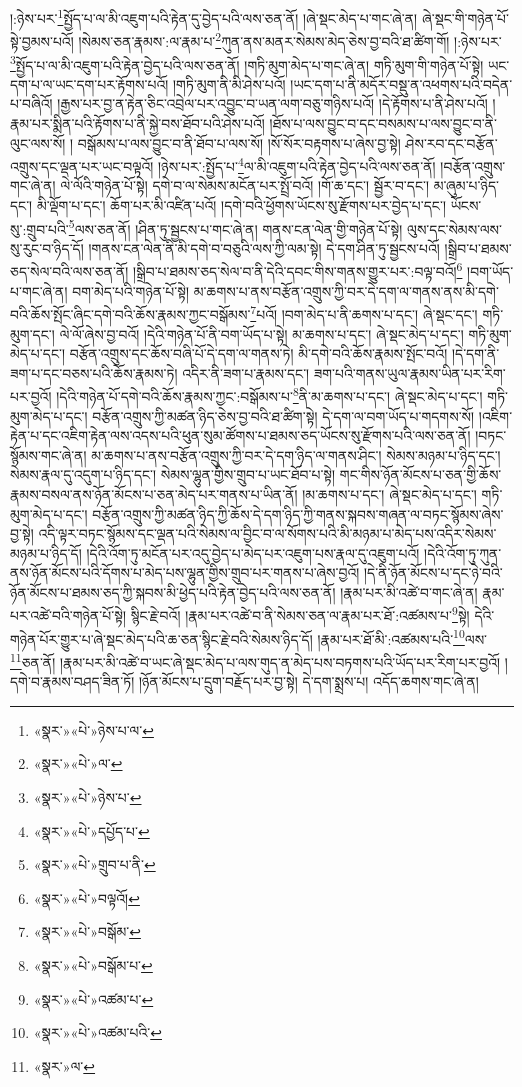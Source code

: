 །:ཉེས་པར་\footnote{«སྣར་»«པེ་»ཉེས་པ་ལ་}སྤྱོད་པ་ལ་མི་འཇུག་པའི་རྟེན་དུ་བྱེད་པའི་ལས་ཅན་ནོ། །ཞེ་སྡང་མེད་པ་གང་ཞེ་ན། ཞེ་སྡང་གི་གཉེན་པོ་སྟེ་བྱམས་པའོ། །སེམས་ཅན་རྣམས་:ལ་རྣམ་པ་\footnote{«སྣར་»«པེ་»ལ་}ཀུན་ནས་མནར་སེམས་མེད་ཅེས་བྱ་བའི་ཐ་ཚིག་གོ། །:ཉེས་པར་\footnote{«སྣར་»«པེ་»ཉེས་པ་}སྤྱོད་པ་ལ་མི་འཇུག་པའི་རྟེན་བྱེད་པའི་ལས་ཅན་ནོ། །གཏི་མུག་མེད་པ་གང་ཞེ་ན། གཏི་མུག་གི་གཉེན་པོ་སྟེ། ཡང་དག་པ་ལ་ཡང་དག་པར་རྟོགས་པའོ། །གཏི་མུག་ནི་མི་ཤེས་པའོ། །ཡང་དག་པ་ནི་མདོར་བསྡུ་ན་འཕགས་པའི་བདེན་པ་བཞིའོ། །རྒྱས་པར་བྱ་ན་རྟེན་ཅིང་འབྲེལ་པར་འབྱུང་བ་ཡན་ལག་བཅུ་གཉིས་པའོ། །དེ་རྟོགས་པ་ནི་ཤེས་པའོ། །རྣམ་པར་སྨིན་པའི་རྟོགས་པ་ནི་སྐྱེ་བས་ཐོབ་པའི་ཤེས་པའོ། །ཐོས་པ་ལས་བྱུང་བ་དང་བསམས་པ་ལས་བྱུང་བ་ནི་ལུང་ལས་སོ། །
བསྒོམས་པ་ལས་བྱུང་བ་ནི་ཐོབ་པ་ལས་སོ། །སོ་སོར་བརྟགས་པ་ཞེས་བྱ་སྟེ། ཤེས་རབ་དང་བརྩོན་འགྲུས་དང་ལྡན་པར་ཡང་བལྟའོ། །ཉེས་པར་:སྤྱོད་པ་\footnote{«སྣར་»«པེ་»དཔྱོད་པ་}ལ་མི་འཇུག་པའི་རྟེན་བྱེད་པའི་ལས་ཅན་ནོ། །བརྩོན་འགྲུས་གང་ཞེ་ན། ལེ་ལོའི་གཉེན་པོ་སྟེ། དགེ་བ་ལ་སེམས་མངོན་པར་སྤྲོ་བའོ། །གོ་ཆ་དང་། སྦྱོར་བ་དང་། མ་ཞུམ་པ་ཉིད་དང་། མི་ལྡོག་པ་དང་། ཆོག་པར་མི་འཛིན་པའོ། །དགེ་བའི་ཕྱོགས་ཡོངས་སུ་རྫོགས་པར་བྱེད་པ་དང་། ཡོངས་སུ་:གྲུབ་པའི་\footnote{«སྣར་»«པེ་»གྲུབ་པ་ནི་}ལས་ཅན་ནོ། །ཤིན་ཏུ་སྦྱངས་པ་གང་ཞེ་ན། གནས་ངན་ལེན་གྱི་གཉེན་པོ་སྟེ། ལུས་དང་སེམས་ལས་སུ་རུང་བ་ཉིད་དོ། །གནས་ངན་ལེན་ནི་མི་དགེ་བ་བཅུའི་ལས་ཀྱི་ལམ་སྟེ། དེ་དག་ཤིན་ཏུ་སྦྱངས་པའོ། །སྒྲིབ་པ་ཐམས་ཅད་སེལ་བའི་ལས་ཅན་ནོ། །སྒྲིབ་པ་ཐམས་ཅད་སེལ་བ་ནི་དེའི་དབང་གིས་གནས་གྱུར་པར་:བལྟ་བའོ།\footnote{«སྣར་»«པེ་»བལྟའོ།} །བག་ཡོད་པ་གང་ཞེ་ན། བག་མེད་པའི་གཉེན་པོ་སྟེ། མ་ཆགས་པ་ནས་བརྩོན་འགྲུས་ཀྱི་བར་དེ་དག་ལ་གནས་ནས་མི་དགེ་བའི་ཆོས་སྤོང་ཞིང་དགེ་བའི་ཆོས་རྣམས་ཀྱང་བསྒོམས་\footnote{«སྣར་»«པེ་»བསྒོམ་}པའོ། །བག་མེད་པ་ནི་ཆགས་པ་དང་། ཞེ་སྡང་དང་། གཏི་མུག་དང་། ལེ་ལོ་ཞེས་བྱ་བའོ། །དེའི་གཉེན་པོ་ནི་བག་ཡོད་པ་སྟེ། མ་ཆགས་པ་དང་། ཞེ་སྡང་མེད་པ་དང་། གཏི་མུག་མེད་པ་དང་། བརྩོན་འགྲུས་དང་ཆོས་བཞི་པོ་དེ་དག་ལ་གནས་ཏེ། མི་དགེ་བའི་ཆོས་རྣམས་སྤོང་བའོ། །དེ་དག་ནི་ཟག་པ་དང་བཅས་པའི་ཆོས་རྣམས་ཏེ། འདིར་ནི་ཟག་པ་རྣམས་དང་། ཟག་པའི་གནས་ཡུལ་རྣམས་ཡིན་པར་རིག་པར་བྱའོ། །དེའི་གཉེན་པོ་དགེ་བའི་ཆོས་རྣམས་ཀྱང་:བསྒོམས་པ་\footnote{«སྣར་»«པེ་»བསྒོམ་པ་}ནི་མ་ཆགས་པ་དང་། ཞེ་སྡང་མེད་པ་དང་། གཏི་མུག་མེད་པ་དང་། བརྩོན་འགྲུས་ཀྱི་མཚན་ཉིད་ཅེས་བྱ་བའི་ཐ་ཚིག་སྟེ། དེ་དག་ལ་བག་ཡོད་པ་གདགས་སོ། །འཇིག་རྟེན་པ་དང་འཇིག་རྟེན་ལས་འདས་པའི་ཕུན་སུམ་ཚོགས་པ་ཐམས་ཅད་ཡོངས་སུ་རྫོགས་པའི་ལས་ཅན་ནོ། །བཏང་སྙོམས་གང་ཞེ་ན། མ་ཆགས་པ་ནས་བརྩོན་འགྲུས་ཀྱི་བར་དེ་དག་ཉིད་ལ་གནས་ཤིང་། སེམས་མཉམ་པ་ཉིད་དང་། སེམས་རྣལ་དུ་འདུག་པ་ཉིད་དང་། སེམས་ལྷུན་གྱིས་གྲུབ་པ་ཡང་ཐོབ་པ་སྟེ། གང་གིས་ཉོན་མོངས་པ་ཅན་གྱི་ཆོས་རྣམས་བསལ་ནས་ཉོན་མོངས་པ་ཅན་མེད་པར་གནས་པ་ཡིན་ནོ། །མ་ཆགས་པ་དང་། ཞེ་སྡང་མེད་པ་དང་། གཏི་མུག་མེད་པ་དང་། བརྩོན་འགྲུས་ཀྱི་མཚན་ཉིད་ཀྱི་ཆོས་དེ་དག་ཉིད་ཀྱི་གནས་སྐབས་གཞན་ལ་བཏང་སྙོམས་ཞེས་བྱ་སྟེ། འདི་ལྟར་བཏང་སྙོམས་དང་ལྡན་པའི་སེམས་ལ་བྱིང་བ་ལ་སོགས་པའི་མི་མཉམ་པ་མེད་པས་འདིར་སེམས་མཉམ་པ་ཉིད་དོ། །དེའི་འོག་ཏུ་མངོན་པར་འདུ་བྱེད་པ་མེད་པར་འཇུག་པས་རྣལ་དུ་འཇུག་པའོ། །དེའི་འོག་ཏུ་ཀུན་ནས་ཉོན་མོངས་པའི་དོགས་པ་མེད་པས་ལྷུན་གྱིས་གྲུབ་པར་གནས་པ་ཞེས་བྱའོ། །དེ་ནི་ཉོན་མོངས་པ་དང་ཉེ་བའི་ཉོན་མོངས་པ་ཐམས་ཅད་ཀྱི་སྐབས་མི་ཕྱེད་པའི་རྟེན་བྱེད་པའི་ལས་ཅན་ནོ། །རྣམ་པར་མི་འཚེ་བ་གང་ཞེ་ན། རྣམ་པར་འཚེ་བའི་གཉེན་པོ་སྟེ། སྙིང་རྗེ་བའོ། །རྣམ་པར་འཚེ་བ་ནི་སེམས་ཅན་ལ་རྣམ་པར་ཐོ་:འཚམས་པ་\footnote{«སྣར་»«པེ་»འཚམ་པ་}སྟེ། དེའི་གཉེན་པོར་གྱུར་པ་ཞེ་སྡང་མེད་པའི་ཆ་ཅན་སྙིང་རྗེ་བའི་སེམས་ཉིད་དོ། །རྣམ་པར་ཐོ་མི་:འཚམས་པའི་\footnote{«སྣར་»«པེ་»འཚམ་པའི་}ལས་\footnote{«སྣར་»ལ་}ཅན་ནོ། །རྣམ་པར་མི་འཚེ་བ་ཡང་ཞེ་སྡང་མེད་པ་ལས་གུད་ན་མེད་པས་བཏགས་པའི་ཡོད་པར་རིག་པར་བྱའོ། །དགེ་བ་རྣམས་བཤད་ཟིན་ཏོ། །ཉོན་མོངས་པ་དྲུག་བརྗོད་པར་བྱ་སྟེ། དེ་དག་སྨྲས་པ། འདོད་ཆགས་གང་ཞེ་ན། 